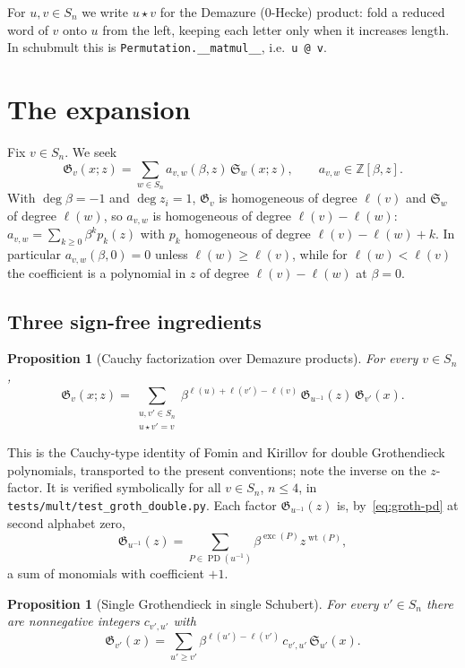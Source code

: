 \documentclass[11pt]{article}
\newtheorem{proposition}[theorem]{Proposition}
\theoremstyle{definition}
\theoremstyle{remark}
\newcommand{\Sch}{\mathfrak{S}}
\newcommand{\Groth}{\mathfrak{G}}
\newcommand{\PD}{\operatorname{PD}}
\newcommand{\ZZ}{\mathbb{Z}}
\newcommand{\wt}{\operatorname{wt}}
\newcommand{\exc}{\operatorname{exc}}
\newcommand{\dem}{\star}
\begin{document}
For $u,v\in S_n$ we write $u\dem v$ for the Demazure (0-Hecke) product:
fold a reduced word of $v$ onto $u$ from the left, keeping each letter only
when it increases length.  In \textsf{schubmult} this is
\texttt{Permutation.\_\_matmul\_\_}, i.e.\ \texttt{u @ v}.

\section{The expansion}

Fix $v\in S_n$.  We seek
\begin{equation}\label{eq:target}
 \Groth_v(x;z)=\sum_{w\in S_n}a_{v,w}(\beta,z)\,\Sch_w(x;z),
 \qquad a_{v,w}\in\ZZ[\beta,z].
\end{equation}
With $\deg\beta=-1$ and $\deg z_i=1$, $\Groth_v$ is homogeneous of degree
$\ell(v)$ and $\Sch_w$ of degree $\ell(w)$, so $a_{v,w}$ is homogeneous of
degree $\ell(v)-\ell(w)$:
$a_{v,w}=\sum_{k\ge0}\beta^k p_k(z)$ with $p_k$ homogeneous of degree
$\ell(v)-\ell(w)+k$.  In particular $a_{v,w}(\beta,0)=0$ unless
$\ell(w)\ge\ell(v)$, while for $\ell(w)<\ell(v)$ the coefficient is a
polynomial in $z$ of degree $\ell(v)-\ell(w)$ at $\beta=0$.

\subsection{Three sign-free ingredients}

\begin{proposition}[Cauchy factorization over Demazure products]
\label{prop:cauchy}
For every $v\in S_n$,
\begin{equation}\label{eq:cauchy}
 \Groth_v(x;z)=\sum_{\substack{u,v'\in S_n\\u\dem v'=v}}
   \beta^{\ell(u)+\ell(v')-\ell(v)}\,
   \Groth_{u^{-1}}(z)\,\Groth_{v'}(x).
\end{equation}
\end{proposition}

This is the Cauchy-type identity of Fomin and Kirillov for double
Grothendieck polynomials, transported to the present conventions; note the
inverse on the $z$-factor.  It is verified symbolically for all $v\in S_n$,
$n\le4$, in \texttt{tests/mult/test\_groth\_double.py}.  Each factor
$\Groth_{u^{-1}}(z)$ is, by~\eqref{eq:groth-pd} at second alphabet zero,
\[
 \Groth_{u^{-1}}(z)=\sum_{P\in\PD(u^{-1})}\beta^{\exc(P)}z^{\wt(P)},
\]
a sum of monomials with coefficient $+1$.

\begin{proposition}[Single Grothendieck in single Schubert]
\label{prop:lenart}
For every $v'\in S_n$ there are nonnegative integers $c_{v',u'}$ with
\begin{equation}\label{eq:g2s}
 \Groth_{v'}(x)=\sum_{u'\ge v'}\beta^{\ell(u')-\ell(v')}\,c_{v',u'}\,\Sch_{u'}(x).
\end{equation}
\end{proposition}
\end{document}
